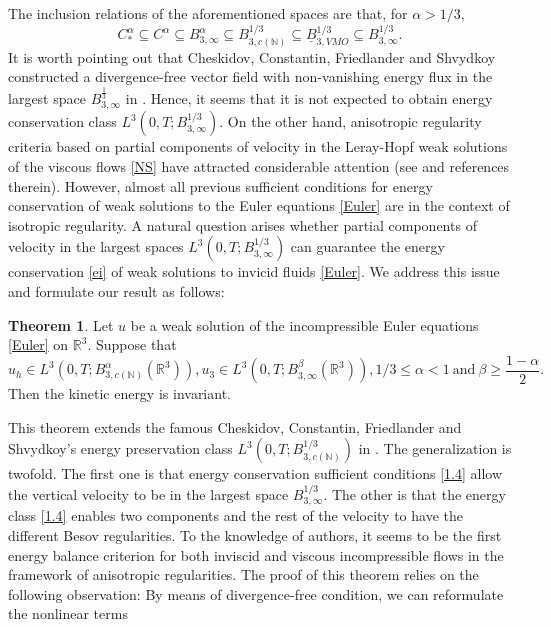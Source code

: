 \documentclass[11pt]{article}
\theoremstyle{plain}\newtheorem{definition}{Definition}[section]
\theoremstyle{definition}\newtheorem{theorem}{Theorem}[section]
\theoremstyle{plain}\newtheorem{lemma}[theorem]{Lemma}
\theoremstyle{plain}\newtheorem{coro}[theorem]{Corollary}
\theoremstyle{plain}\newtheorem{prop}[theorem]{Proposition}
\theoremstyle{remark}\newtheorem{remark}{Remark}[section]
\newcommand{\be}{\begin{equation}}
\newcommand{\ee}{\end{equation}}
\numberwithin{equation}{section}
\begin{document}
 The inclusion relations of the aforementioned   spaces are that,
for $\alpha >1/3$,
\be\label{includ}
C_{\ast}^{\alpha} \subseteq C^\alpha \subseteq B^\alpha_{3,\infty}\subseteq B^{1/3}_{3,c(\mathbb{N})}\subseteq \underline{B}^{1/3}_{3,VMO}\subseteq B^{1/3}_{3,\infty}.
\ee
It is worth pointing out that
Cheskidov, Constantin, Friedlander and Shvydkoy constructed  a divergence-free vector field with non-vanishing energy flux in the largest space $B^{\frac{1}{3}}_{3,\infty}$ in \cite{[CCFS]}. Hence, it seems that it is not expected to obtain energy conservation class  $L^{3} (0,T; B^{1/3}_{3,\infty}).$
On the other hand, anisotropic regularity criteria based on  partial components of velocity in the Leray-Hopf weak solutions of the  viscous flows \eqref{NS} have attracted considerable attention (see \cite{[KZ],[CT],[CZZ],[HLLZ],[NP],[BC07],[Zheng],[WZZ],[WZ]} and   references therein). However, almost all previous sufficient conditions for energy conservation of weak solutions to the
Euler equations \eqref{Euler} are in the context of isotropic regularity.
A natural  question arises whether partial components of velocity in the largest spaces $L^{3} (0,T; B^{1/3}_{3,\infty}) $ can guarantee the energy conservation \eqref{ei} of weak solutions to   invicid fluids \eqref{Euler}.
 We address this issue and formulate our result as follows:
 \begin{theorem}\label{the1.1}
  Let $u$ be a weak solution of the incompressible   Euler equations \eqref{Euler} on   $\mathbb{R}^{3}$. Suppose that  \be\label{1.4}
u_h\in L^{3} (0,T; B^{\alpha}_{3,c(\mathbb{N})}(\mathbb{R}^3)), u_3\in L^{3} (0,T; B^{\beta}_{3,\infty}(\mathbb{R}^3)),  1/3\leq \alpha <1\ \text{and}\ \beta\geq \frac{1-\alpha}{2}.
 \ee
  Then the  kinetic energy is invariant.
 \end{theorem}
This theorem  extends the famous Cheskidov, Constantin, Friedlander and Shvydkoy's energy preservation class $L^{3} (0,T; B^{1/3}_{3,c(\mathbb{N})})$ in \cite{[CCFS]}. The generalization   is twofold. The first one is that energy conservation sufficient conditions \eqref{1.4} allow   the vertical velocity to be  in the largest space $B^{1/3}_{3,\infty}$.   The
other is that the energy class \eqref{1.4} enables two components and the rest of the velocity to have the    different  Besov  regularities.  To the knowledge of authors, it seems to be the first energy balance criterion for  both  inviscid and viscous incompressible flows in the framework of anisotropic  regularities. The proof of this theorem relies on the following observation:
By means of divergence-free condition, we can reformulate the nonlinear terms
\end{document}
